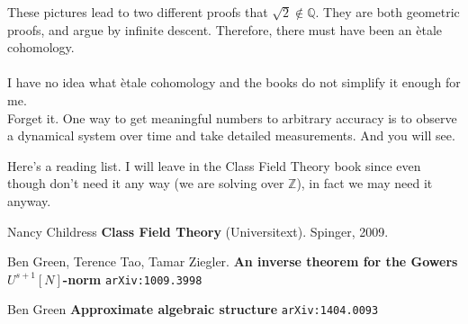 \documentclass[12pt]{article}
\begin{document}
These pictures lead to two different proofs that $\sqrt{2} \notin \mathbb{Q}$.  They are both geometric proofs, and argue by infinite descent.  Therefore, there must have been an \`{e}tale cohomology. \\ \\
I have no idea what \`{e}tale cohomology and the books do not simplify it enough for me. \\ 
Forget it.  One way to get meaningful numbers to arbitrary accuracy is to observe a dynamical system over time and take detailed measurements.  And you will see.

\newpage

\vfill


\noindent Here's a reading list. I will leave in the Class Field Theory book since even though don't need it any way (we are solving over $\mathbb{Z}$), in fact we may need it anyway.

\begin{thebibliography}{}

\item Nancy Childress \textbf{Class Field Theory} (Universitext).  Spinger, 2009.

\item Ben Green, Terence Tao, Tamar Ziegler. \textbf{An inverse theorem for the Gowers $U^{s+1}[N]$-norm} \texttt{arXiv:1009.3998}

\item Ben Green \textbf{Approximate algebraic structure} \texttt{arXiv:1404.0093}

\end{thebibliography}

\end{document}
